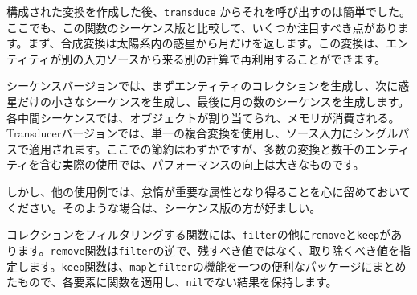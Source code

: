 構成された変換を作成した後、\texttt{transduce} からそれを呼び出すのは簡単でした。ここでも、この関数のシーケンス版と比較して、いくつか注目すべき点があります。まず、合成変換は太陽系内の惑星から月だけを返します。この変換は、エンティティが別の入力ソースから来る別の計算で再利用することができます。

シーケンスバージョンでは、まずエンティティのコレクションを生成し、次に惑星だけの小さなシーケンスを生成し、最後に月の数のシーケンスを生成します。各中間シーケンスでは、オブジェクトが割り当てられ、メモリが消費される。Transducerバージョンでは、単一の複合変換を使用し、ソース入力にシングルパスで適用されます。ここでの節約はわずかですが、多数の変換と数千のエンティティを含む実際の使用では、パフォーマンスの向上は大きなものです。

しかし、他の使用例では、怠惰が重要な属性となり得ることを心に留めておいてください。そのような場合は、シーケンス版の方が好ましい。

コレクションをフィルタリングする関数には、\texttt{filter}の他に\texttt{remove}と\texttt{keep}があります。\texttt{remove}関数は\texttt{filter}の逆で、残すべき値ではなく、取り除くべき値を指定します。\texttt{keep}関数は、\texttt{map}と\texttt{filter}の機能を一つの便利なパッケージにまとめたもので、各要素に関数を適用し、\texttt{nil}でない結果を保持します。